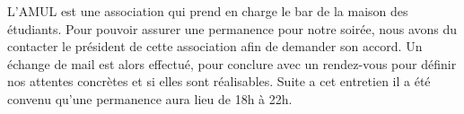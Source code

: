 L'AMUL est une association qui prend en charge le bar de la maison des étudiants.
Pour pouvoir assurer une permanence pour notre soirée, nous avons du contacter le président de cette association afin de demander son accord.
Un échange de mail est alors effectué, pour conclure avec un rendez-vous pour définir nos attentes concrètes et si elles sont réalisables.
Suite a cet entretien il a été convenu qu'une permanence aura lieu de 18h à 22h.
